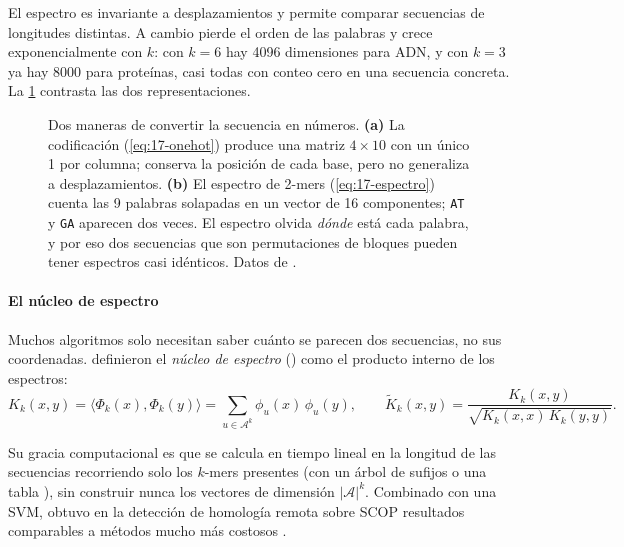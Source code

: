 El espectro es invariante a desplazamientos y permite comparar secuencias de longitudes distintas. A cambio pierde el orden de las palabras y crece exponencialmente con $k$: con $k=6$ hay \num{4096} dimensiones para ADN, y con $k=3$ ya hay \num{8000} para proteínas, casi todas con conteo cero en una secuencia concreta. La \cref{fig:17-onehot} contrasta las dos representaciones.

\begin{figure}[!tbp]
  \centering
  
  \caption[Codificación one-hot y espectro de $k$-mers]{Dos maneras de convertir la secuencia  en números. \textbf{(a)} La codificación  (\cref{eq:17-onehot}) produce una matriz $4\times10$ con un único 1 por columna; conserva la posición de cada base, pero no generaliza a desplazamientos. \textbf{(b)} El espectro de 2-mers (\cref{eq:17-espectro}) cuenta las 9 palabras solapadas en un vector de 16 componentes; \texttt{AT} y \texttt{GA} aparecen dos veces. El espectro olvida \emph{dónde} está cada palabra, y por eso dos secuencias que son permutaciones de bloques pueden tener espectros casi idénticos. Datos de .}
  \label{fig:17-onehot}
\end{figure}

\paragraph{El núcleo de espectro} Muchos algoritmos solo necesitan saber cuánto se parecen dos secuencias, no sus coordenadas. \textcite{c17-leslie2002} definieron el \emph{núcleo de espectro} () como el producto interno de los espectros:
\begin{equation}\label{eq:17-kernel}
K_k(x,y) = \big\langle \Phi_k(x), \Phi_k(y)\big\rangle = \sum_{u\in\mathcal{A}^k} \phi_u(x)\,\phi_u(y),
\qquad
\tilde K_k(x,y) = \frac{K_k(x,y)}{\sqrt{K_k(x,x)\,K_k(y,y)}}.
\end{equation}

\begin{simbolos}
\end{simbolos}

Su gracia computacional es que se calcula en tiempo lineal en la longitud de las secuencias recorriendo solo los $k$-mers presentes (con un árbol de sufijos o una tabla ), sin construir nunca los vectores de dimensión $|\mathcal{A}|^k$. Combinado con una SVM, obtuvo en la detección de homología remota sobre SCOP resultados comparables a métodos mucho más costosos \parencite{c17-leslie2002}.

